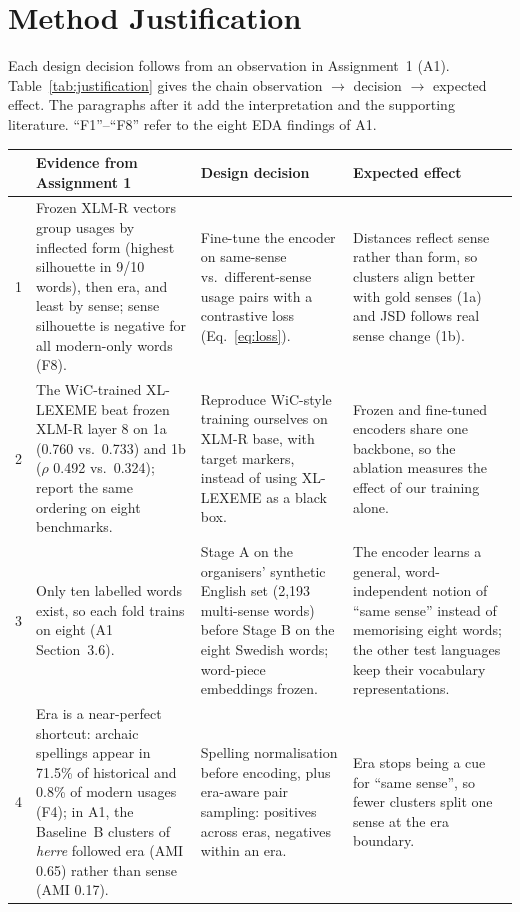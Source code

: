 \section{Method Justification}
\label{sec:justification}

Each design decision follows from an observation in Assignment~1 (A1). Table~\ref{tab:justification}
gives the chain observation $\rightarrow$ decision $\rightarrow$ expected effect. The paragraphs
after it add the interpretation and the supporting literature. ``F1''--``F8'' refer to the
eight EDA findings of A1.

\begin{table}[t]
\centering
\small
\renewcommand{\arraystretch}{1.15}
\begin{tabularx}{\textwidth}{@{}p{}XXX@{}}
\toprule
 & \textbf{Evidence from Assignment 1} & \textbf{Design decision} & \textbf{Expected effect}\\
\midrule
1 & Frozen XLM-R vectors group usages by inflected form (highest silhouette in 9/10 words), then era, and least by sense; sense silhouette is negative for all modern-only words (F8). & Fine-tune the encoder on same-sense vs.\ different-sense usage pairs with a contrastive loss (Eq.~\ref{eq:loss}). & Distances reflect sense rather than form, so clusters align better with gold senses (1a) and JSD follows real sense change (1b).\\
2 & The WiC-trained XL-LEXEME beat frozen XLM-R layer 8 on 1a (0.760 vs.\ 0.733) and 1b ($\rho$ 0.492 vs.\ 0.324); \citet{periti2024systematic} report the same ordering on eight benchmarks. & Reproduce WiC-style training ourselves on XLM-R base, with target markers, instead of using XL-LEXEME as a black box. & Frozen and fine-tuned encoders share one backbone, so the ablation measures the effect of our training alone.\\
3 & Only ten labelled words exist, so each fold trains on eight (A1 Section~3.6). & Stage A on the organisers' synthetic English set (2{,}193 multi-sense words) before Stage B on the eight Swedish words; word-piece embeddings frozen. & The encoder learns a general, word-independent notion of ``same sense'' instead of memorising eight words; the other test languages keep their vocabulary representations.\\
4 & Era is a near-perfect shortcut: archaic spellings appear in 71.5\% of historical and 0.8\% of modern usages (F4); in A1, the Baseline~B clusters of \textit{herre} followed era (AMI 0.65) rather than sense (AMI 0.17). & Spelling normalisation before encoding, plus era-aware pair sampling: positives across eras, negatives within an era. & Era stops being a cue for ``same sense'', so fewer clusters split one sense at the era boundary.\\

\end{tabularx}
\end{table}

